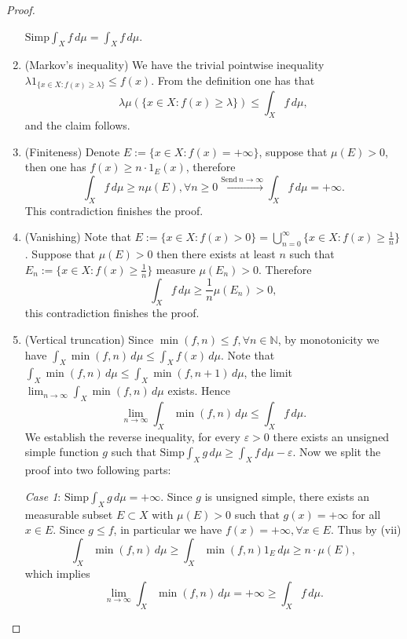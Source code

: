 \documentclass[a4paper]{article}
\begin{document}
\begin{proof}
\begin{enumerate}[label = (\roman*)]
    $\mathrm{Simp}\int_X f \,d\mu = \int_X f \,d\mu$.
    \item (Markov's inequality) We have the trivial pointwise inequality $\lambda 1_{\{x \in X : f(x) \geq \lambda\}} \leq f(x)$.
    From the definition one has that $$
    \lambda \mu(\{x \in X : f(x) \geq \lambda\}) \leq \int_X f \,d\mu,
    $$and the claim follows.
    \item (Finiteness) Denote $E := \{x \in X : f(x) = +\infty\}$, suppose that $\mu(E) > 0$, then one has 
    $f(x) \geq n\cdot 1_{E}(x)$, therefore $$
    \int_X f \,d\mu \geq n\mu(E), \forall n \geq 0 \xrightarrow{\text{Send}\ n \to \infty} \int_X f \,d\mu = +\infty.
    $$This contradiction finishes the proof.
    \item (Vanishing) Note that $E := \{x \in X : f(x) > 0\} = \bigcup_{n = 0}^\infty \{x \in X : f(x) \geq \frac{1}{n}\}$.
    Suppose that $\mu(E) > 0$ then there exists at least $n$ such that $E_n := \{x \in X : f(x) \geq \frac{1}{n}\}$
    measure $\mu(E_n) > 0$. Therefore $$
    \int_X f \,d\mu \geq \frac{1}{n} \mu(E_n) > 0,
    $$this contradiction finishes the proof.
    \item (Vertical truncation) Since $\min(f, n) \leq f, \forall n \in \mathbb{N}$, by monotonicity we have
    $\int_X \min(f,n) \,d\mu \leq\int_X f(x) \,d\mu$. Note that 
    $\int_X \min(f,n) \,d\mu \leq \int_X \min(f,n + 1) \,d\mu$, the limit
    $\lim_{n\to \infty}\int_X \min(f,n) \,d\mu$ exists. Hence $$
    \lim_{n \to \infty} \int_X \min(f ,n) \,d\mu \leq \int_X f \,d\mu.
    $$ We establish the reverse inequality, for every $\varepsilon > 0$ there exists an unsigned simple function $g$
    such that $\mathrm{Simp}\int_X g \,d\mu \geq\int_X f \,d\mu - \varepsilon$.
    Now we split the proof into two following parts:
    
    \emph{Case 1}: $\mathrm{Simp}\int_X g \,d\mu = +\infty$. Since $g$ is unsigned simple, there exists an 
    measurable subset $E \subset X$ with $\mu(E) > 0$ such that $g(x) = +\infty$ for all $x \in E$. Since $g \leq f$, 
    in particular we have $f(x) = +\infty, \forall x \in E$.
    Thus by (vii) $$
    \int_X \min(f, n) \,d\mu \geq \int_X \min(f,n)1_E \,d\mu \geq 
    n \cdot \mu(E),
    $$which implies$$
    \lim_{n \to \infty} \int_X \min(f,n) \,d\mu = +\infty \geq \int_X f \,d\mu.
    $$
    

\end{enumerate}
\end{proof}
\end{document}
